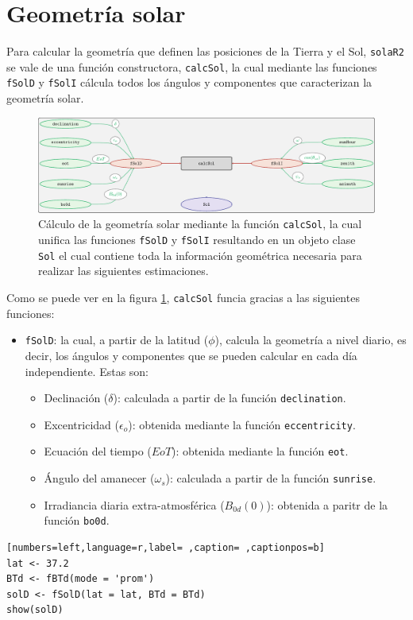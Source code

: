 \section{Geometría solar}
\label{sec:orgb474fe2}
\label{sec:geometria-solar}
Para calcular la geometría que definen las posiciones de la Tierra y el Sol, \texttt{solaR2} se vale de una función constructora, \texttt{calcSol}, la cual mediante las funciones \texttt{fSolD} y \texttt{fSolI} cálcula todos los ángulos y componentes que caracterizan la geometría solar.
\begin{figure}[htbp]
\centering
\includegraphics[keepaspectratio,width=\textwidth,height=0.5\textheight]{figuras/calcSol.pdf}
\caption{Cálculo de la geometría solar mediante la función \texttt{calcSol}, la cual unifica las funciones \texttt{fSolD} y \texttt{fSolI} resultando en un objeto clase \texttt{Sol} el cual contiene toda la información geométrica necesaria para realizar las siguientes estimaciones. \label{fig:calcSol}}
\end{figure}

Como se puede ver en la figura \ref{fig:calcSol}, \texttt{calcSol} funcia gracias a las siguientes funciones:
\begin{itemize}
\item \texttt{fSolD}: la cual, a partir de la latitud (\(\phi\)), calcula la geometría a nivel diario, es decir, los ángulos y componentes que se pueden calcular en cada día independiente.
Estas son:
\begin{itemize}
\item Declinación (\(\delta\)): calculada a partir de la función \texttt{declination}.
\item Excentricidad (\(\epsilon_o\)): obtenida mediante la función \texttt{eccentricity}.
\item Ecuación del tiempo (\(EoT\)): obtenida mediante la función \texttt{eot}.
\item Ángulo del amanecer (\(\omega_s\)): calculada a partir de la función \texttt{sunrise}.
\item Irradiancia diaria extra-atmosférica (\(B_{0d}(0)\)): obtenida a paritr de la función \texttt{bo0d}.
\end{itemize}
\end{itemize}
\begin{lstlisting}[numbers=left,language=r,label= ,caption= ,captionpos=b]
lat <- 37.2
BTd <- fBTd(mode = 'prom')
solD <- fSolD(lat = lat, BTd = BTd)
show(solD)
\end{lstlisting}

